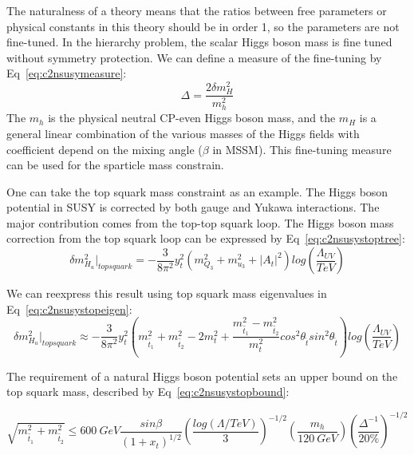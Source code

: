 The naturalness of a theory means that the ratios between free parameters or physical constants in this theory should be in order 1, so the parameters are not fine-tuned. In the hierarchy problem, the scalar Higgs boson mass is fine tuned without symmetry protection. We can define a measure of the fine-tuning by Eq~\ref{eq:c2nsusymeasure}:
\begin{equation}
 \Delta = \frac{2\delta m_{H}^{2}}{m_{h}^{2}}
 \label{eq:c2nsusymeasure}
\end{equation}
The $m_{h}$ is the physical neutral CP-even Higgs boson mass, and the $m_{H}$ is a general linear combination of the various masses of the Higgs fields with coefficient depend on the mixing angle ($\beta$ in MSSM). This fine-tuning measure can be used for the sparticle mass constrain. 

One can take the top squark mass constraint as an example. The Higgs boson potential in SUSY is corrected by both gauge and Yukawa interactions. The major contribution comes from the top-top squark loop. The Higgs boson mass correction from the top squark loop can be expressed by Eq~\ref{eq:c2nsusystoptree}: 
\begin{equation}
 \delta m_{H_{u}}^{2}|_{top squark} = - \frac{3}{8\pi^{2}}y_{t}^{2}(m_{Q_{3}}^{2}+m_{u_{3}}^{2}+|A_{t}|^{2})log(\frac{\Lambda_{UV}}{TeV})
 \label{eq:c2nsusystoptree}
\end{equation}

We can reexpress this result using top squark mass eigenvalues in Eq~\ref{eq:c2nsusystopeigen}:
\begin{equation}
	\delta m_{H_{u}}^{2}|_{top squark} \approx - \frac{3}{8\pi^{2}}y_{t}^{2}(m_{\tilde{t_{1}}}^{2}+m_{\tilde{t_{2}}}^{2}-2m_{t}^{2}+\frac{m_{\tilde{t_{1}}}^{2}-m_{\tilde{t_{2}}}^{2}}{m_{t}^{2}}cos^{2}\theta_{\tilde{t}}sin^{2}\theta_{\tilde{t}})log(\frac{\Lambda_{UV}}{TeV})
 \label{eq:c2nsusystopeigen}
\end{equation}

The requirement of a natural Higgs boson potential sets an upper bound on the top squark mass\cite{Papucci:2011wy}, described by Eq~\ref{eq:c2nsusystopbound}:

\begin{equation}
 \sqrt{m_{\tilde{t_{1}}}^{2}+m_{\tilde{t_{2}}}^{2}} \leq 600~GeV\frac{sin\beta}{(1+x_{t})^{1/2}} (\frac{log(\Lambda/TeV)}{3})^{-1/2}(\frac{m_{h}}{120~GeV})(\frac{\Delta^{-1}}{20\%})^{-1/2}
 \label{eq:c2nsusystopbound}
\end{equation}

